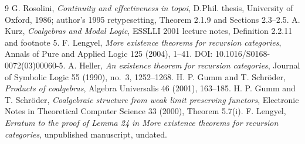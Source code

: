 \documentclass[11pt]{article}
\begin{document}
\begin{thebibliography}{9}
 G. Rosolini, \emph{Continuity and effectiveness in topoi}, D.Phil. thesis, University of Oxford, 1986; author's 1995 retypesetting, Theorem 2.1.9 and Sections 2.3--2.5.
 A. Kurz, \emph{Coalgebras and Modal Logic}, ESSLLI 2001 lecture notes, Definition 2.2.11 and footnote 5.
 F. Lengyel, \emph{More existence theorems for recursion categories}, Annals of Pure and Applied Logic 125 (2004), 1--41. DOI: 10.1016/S0168-0072(03)00060-5.
 A. Heller, \emph{An existence theorem for recursion categories}, Journal of Symbolic Logic 55 (1990), no.~3, 1252--1268.
 H. P. Gumm and T. Schr\"oder, \emph{Products of coalgebras}, Algebra Universalis 46 (2001), 163--185.
 H. P. Gumm and T. Schr\"oder, \emph{Coalgebraic structure from weak limit preserving functors}, Electronic Notes in Theoretical Computer Science 33 (2000), Theorem 5.7(i).
 F. Lengyel, \emph{Erratum to the proof of Lemma 24 in More existence theorems for recursion categories}, unpublished manuscript, undated.
\end{thebibliography}
\end{document}
